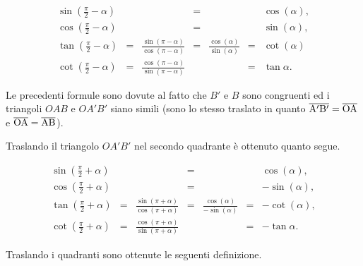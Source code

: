 \begin{definition}
    \begin{equation*}
        \begin{matrix}
            \sin\left(\frac{\pi}{2}-\alpha\right)&& &=& &&\cos(\alpha),\\
            \cos\left(\frac{\pi}{2}-\alpha\right)&& &=& &&\sin(\alpha),\\
            \tan\left(\frac{\pi}{2}-\alpha\right)&=&\frac{\sin\left(\pi-\alpha\right)}{\cos\left(\pi-\alpha\right)}&=&\frac{\cos(\alpha)}{\sin(\alpha)}&=&\cot(\alpha)\\
            \cot\left(\frac{\pi}{2}-\alpha\right)&=&\frac{\cos(\pi-\alpha)}{\sin(\pi-\alpha)}&&&=&\tan\alpha.
        \end{matrix}
    \end{equation*}
\end{definition}

Le precedenti formule sono dovute al fatto che $B'$ e $B$ sono congruenti ed i triangoli $OAB$ e $OA'B'$ siano simili (sono lo stesso traslato in quanto $\overline{\rm A'B'}=\overline{\rm OA}$ e $\overline{\rm OA}=\overline{\rm AB}$).

Traslando il triangolo $OA'B'$ nel secondo quadrante è ottenuto quanto segue.

\begin{definition}
    \begin{equation*}
        \begin{matrix}
            \sin\left(\frac{\pi}{2}+\alpha\right)&& &=& &&\cos(\alpha),\\
            \cos\left(\frac{\pi}{2}+\alpha\right)&& &=& &&-\sin(\alpha),\\
            \tan\left(\frac{\pi}{2}+\alpha\right)&=&\frac{\sin\left(\pi+\alpha\right)}{\cos\left(\pi+\alpha\right)}&=&\frac{\cos(\alpha)}{-\sin(\alpha)}&=&-\cot(\alpha),\\
            \cot\left(\frac{\pi}{2}+\alpha\right)&=&\frac{\cos(\pi+\alpha)}{\sin(\pi+\alpha)}&&&=&-\tan\alpha.
        \end{matrix}
    \end{equation*}
\end{definition}

Traslando i quadranti sono ottenute le seguenti definizione.

